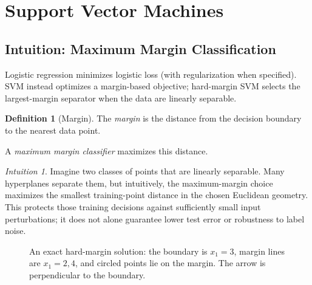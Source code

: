 \documentclass[11pt,twoside]{article}
\numberwithin{equation}{section}
\newcommand{\vect}[1]{\bm{#1}}
\newcommand{\norm}[1]{\left\lVert#1\right\rVert}
\theoremstyle{plain}
\theoremstyle{definition}
\newtheorem{definition}[theorem]{Definition}
\theoremstyle{remark}
\newtheorem{intuition}[theorem]{Intuition}
\begin{document}
\section{Support Vector Machines}
\label{sec:svm}

\subsection{Intuition: Maximum Margin Classification}

Logistic regression minimizes logistic loss (with regularization when specified). SVM instead optimizes a margin-based objective; hard-margin SVM selects the largest-margin separator when the data are linearly separable.

\begin{definition}[Margin]
The \emph{margin} is the distance from the decision boundary to the nearest data point.

A \emph{maximum margin classifier} maximizes this distance.
\end{definition}

\begin{intuition}
Imagine two classes of points that are linearly separable. Many hyperplanes separate them, but intuitively, the maximum-margin choice maximizes the smallest training-point distance in the chosen Euclidean geometry. This protects those training decisions against sufficiently small input perturbations; it does not alone guarantee lower test error or robustness to label noise.
\end{intuition}

\begin{figure}[H]
\centering
{}
\caption{An exact hard-margin solution: the boundary is $x_1=3$, margin lines are $x_1=2,4$, and circled points lie on the margin. The arrow is perpendicular to the boundary.}
\end{figure}
\end{document}
